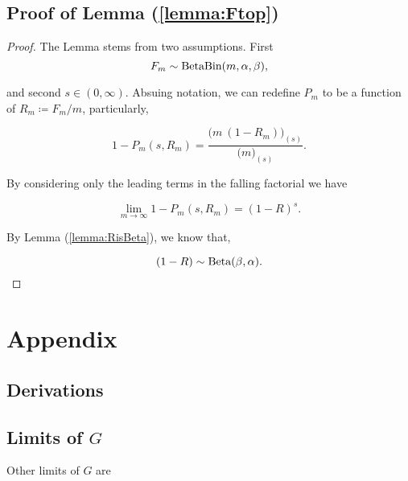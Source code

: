 \documentclass[../../main.tex]{subfiles}
\begin{document}
\subsection[From distribution to probability]{Proof of Lemma (\ref{lemma:Ftop})}


\begin{proof}
    The Lemma stems from two assumptions. First
    \begin{equation}
        F_m \sim \text{Beta}\text{Bin}(m, \alpha, \beta),
    \end{equation}

    and second $s \in (0, \infty)$. Absuing notation, we can redefine $P_m$ to be a function of $R_m \coloneqq F_m / m$, particularly,
    
    \begin{equation}
        1 - P_m(s, R_m) = \frac{\big(m \ (1 - R_m)\big)_{(s)}}{\big( m \big)_{(s)}}.
    \end{equation}

    By considering only the leading terms in the falling factorial we have

    \begin{equation}
        \lim_{m \rightarrow \infty} 1 - P_m(s, R_m) = (1 - R)^s.
    \end{equation}

    By Lemma (\ref{lemma:RisBeta}), we know that,

    \begin{equation}
        (1 - R) \sim \text{Beta}(\beta, \alpha).
    \end{equation}

\end{proof}

\newpage
\section{Appendix}

\subsection{Derivations}\label{appendix:derivations}


\subsection[Limits of Shift]{Limits of $G$}

Other limits of $G$ are
\end{document}
